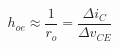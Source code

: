 %
\begin{equation}
  \label{eq:hoe}
  h_{oe} \approx \frac{1}{r_o} = \frac{\Delta i_C}{\Delta v_{CE}}
\end{equation}


